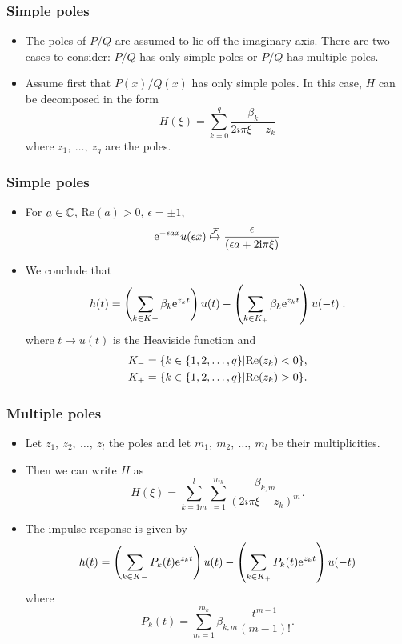 \begin{frame}
\frametitle{Simple poles}
\begin{itemize}
\item The poles of $P/Q$ are assumed to lie off the imaginary axis. There are two cases to consider: $P/Q$ has only simple poles or $P/Q$ has multiple poles.
\item Assume first that $P(x)/Q(x)$ has only simple poles. In this case, $H$ can be decomposed in the form
$$
H(\xi)=\sum_{k=0}^{q}\frac{\beta_{k}}{2i\pi\xi-z_{k}}
$$
where $z_{1},\ \ldots,\ z_{q}$ are the poles.
\end{itemize}
\end{frame}

\begin{frame}
\frametitle{Simple poles}
\begin{itemize}
\item For $a \in \mathbb{C}$, $\mathrm{Re}(a) > 0$, $\epsilon= \pm 1$,
\[
\mathrm{e}^{-\epsilon a x} u(\epsilon x) \stackrel{\mathcal{F}}{\mapsto} \frac{\epsilon}{(\epsilon a + 2 \mathrm{i} \pi \xi)}
\]
\item We conclude that
$$
h(t)=\left(\sum_{k\in K-}\beta_{k} \mathrm{e}^{z_{k}t} \right)u(t)- \left(\sum_{k\in K_{+}}\beta_{k} \mathrm{e}^{z_{k}t} \right)u(-t) \;.
$$
where $t \mapsto u(t)$ is the Heaviside function and
\begin{align*}
K_{-} &=\{k\in\{1,2,\ldots,q\}|{\rm Re}(z_{k})<0\}, \\
K_{+} &=\{k\in\{1,2,\ldots,q\}|{\rm Re}(z_{k})>0\}.
\end{align*}
\end{itemize}
\end{frame}

\begin{frame}
\frametitle{Multiple poles}
\begin{itemize}
\item Let $z_{1},\ z_{2},\ \ldots,\ z_{l}$ the poles and let $m_{1},\ m_{2},\ \ldots,\ m_{l}$ be their multiplicities.
\item Then we can write $H$ as
$$
H(\xi)=\sum_{k=1m}^{l}\sum_{=1}^{m_{k}}\frac{\beta_{k,m}}{(2i\pi\xi-z_{k})^{m}}.
$$
\item The impulse response is given by
$$
h(t)=\left(\displaystyle \sum_{k\in K-}P_{k}(t) \mathrm{e}^{z_{k}t}\right)u(t)-\left(\sum_{k\in K_{+}}P_{k}(t) \mathrm{e}^{z_{k}t}\right)u(-t)
$$
where
$$
P_{k}(t)=\sum_{m=1}^{m_{k}}\beta_{k,m} \frac{t^{m-1}}{(m-1)!}.
$$
\end{itemize}
\end{frame}


